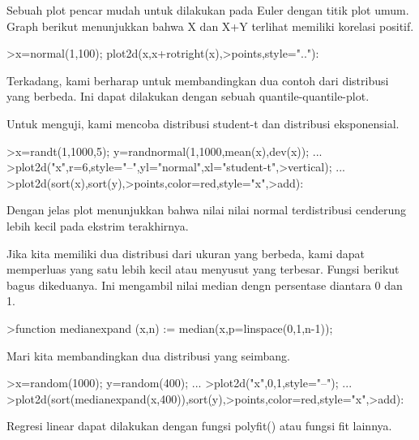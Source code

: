 \documentclass[a4paper,10pt]{article}
\begin{document}
\begin{eulernotebook}
\begin{eulercomment}
Sebuah plot pencar mudah untuk dilakukan pada Euler dengan titik plot umum. Graph berikut
menunjukkan bahwa X dan X+Y terlihat memiliki korelasi positif.
\end{eulercomment}
\begin{eulerprompt}
>x=normal(1,100); plot2d(x,x+rotright(x),>points,style=".."):
\end{eulerprompt}
\begin{eulercomment}
Terkadang, kami berharap untuk membandingkan dua contoh dari distribusi yang berbeda. Ini
dapat dilakukan dengan sebuah quantile-quantile-plot.

Untuk menguji, kami mencoba distribusi student-t dan distribusi eksponensial.
\end{eulercomment}
\begin{eulerprompt}
>x=randt(1,1000,5); y=randnormal(1,1000,mean(x),dev(x)); ...
>plot2d("x",r=6,style="--",yl="normal",xl="student-t",>vertical); ...
>plot2d(sort(x),sort(y),>points,color=red,style="x",>add):
\end{eulerprompt}
\begin{eulercomment}
Dengan jelas plot menunjukkan bahwa nilai nilai normal terdistribusi cenderung lebih kecil
pada ekstrim terakhirnya.

Jika kita memiliki dua distribusi dari ukuran yang berbeda, kami dapat memperluas yang
satu lebih kecil atau menyusut yang terbesar. Fungsi berikut bagus dikeduanya. Ini
mengambil nilai median dengn persentase diantara 0 dan 1.
\end{eulercomment}
\begin{eulerprompt}
>function medianexpand (x,n) := median(x,p=linspace(0,1,n-1));
\end{eulerprompt}
\begin{eulercomment}
Mari kita membandingkan dua distribusi yang seimbang.
\end{eulercomment}
\begin{eulerprompt}
>x=random(1000); y=random(400); ...
>plot2d("x",0,1,style="--"); ...
>plot2d(sort(medianexpand(x,400)),sort(y),>points,color=red,style="x",>add):
\end{eulerprompt}
\begin{eulercomment}
Regresi linear dapat dilakukan dengan fungsi polyfit() atau fungsi fit
lainnya.


\end{eulercomment}
\end{eulernotebook}
\end{document}
